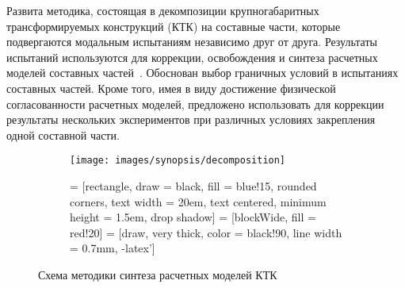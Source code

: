 Развита методика, состоящая в декомпозиции крупногабаритных трансформируемых конструкций (КТК) на составные части, которые подвергаются модальным испытаниям независимо друг от друга. Результаты испытаний используются для коррекции, освобождения и синтеза расчетных моделей составных частей~. Обоснован выбор граничных условий в испытаниях составных частей. Кроме того, имея в виду достижение физической согласованности расчетных моделей, предложено использовать для коррекции результаты нескольких экспериментов при различных условиях закрепления одной составной части.

\begin{figure}[!htb]
	\centering
	\begin{subfigure}[b]{0.54\textwidth}
		\texttt{[image: images/synopsis/decomposition]}
	\end{subfigure}
	\hfill
	\begin{subfigure}[b]{0.45\textwidth}
         = [rectangle, draw = black, fill = blue!15, rounded corners, text width = 20em, text centered, minimum height = 1.5em, drop shadow] 
         = [blockWide, fill = red!20]
         = [draw, very thick, color = black!90, line width = 0.7mm, -latex'] 
        \small
        \def\nodeDist{0.45cm}
	\end{subfigure}
    \caption{Схема методики синтеза расчетных моделей КТК} \label{fig:schemeDecomposition}
\end{figure}  

